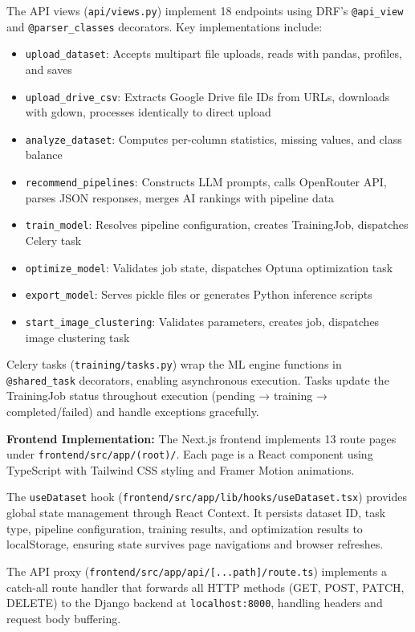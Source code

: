 \documentclass[12pt,a4paper]{report}
\begin{document}
The API views (\texttt{api/views.py}) implement 18 endpoints using DRF's \texttt{@api\_view} and \texttt{@parser\_classes} decorators. Key implementations include:
\begin{itemize}
    \item \texttt{upload\_dataset}: Accepts multipart file uploads, reads with pandas, profiles, and saves
    \item \texttt{upload\_drive\_csv}: Extracts Google Drive file IDs from URLs, downloads with gdown, processes identically to direct upload
    \item \texttt{analyze\_dataset}: Computes per-column statistics, missing values, and class balance
    \item \texttt{recommend\_pipelines}: Constructs LLM prompts, calls OpenRouter API, parses JSON responses, merges AI rankings with pipeline data
    \item \texttt{train\_model}: Resolves pipeline configuration, creates TrainingJob, dispatches Celery task
    \item \texttt{optimize\_model}: Validates job state, dispatches Optuna optimization task
    \item \texttt{export\_model}: Serves pickle files or generates Python inference scripts
    \item \texttt{start\_image\_clustering}: Validates parameters, creates job, dispatches image clustering task
\end{itemize}

Celery tasks (\texttt{training/tasks.py}) wrap the ML engine functions in \texttt{@shared\_task} decorators, enabling asynchronous execution. Tasks update the TrainingJob status throughout execution (pending → training → completed/failed) and handle exceptions gracefully.

\textbf{Frontend Implementation:}
The Next.js frontend implements 13 route pages under \texttt{frontend/src/app/(root)/}. Each page is a React component using TypeScript with Tailwind CSS styling and Framer Motion animations.

The \texttt{useDataset} hook (\texttt{frontend/src/app/lib/hooks/useDataset.tsx}) provides global state management through React Context. It persists dataset ID, task type, pipeline configuration, training results, and optimization results to localStorage, ensuring state survives page navigations and browser refreshes.

The API proxy (\texttt{frontend/src/app/api/[...path]/route.ts}) implements a catch-all route handler that forwards all HTTP methods (GET, POST, PATCH, DELETE) to the Django backend at \texttt{localhost:8000}, handling headers and request body buffering.
\end{document}
